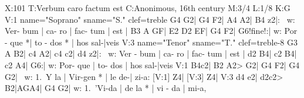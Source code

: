 X:101
T:Verbum caro factum est
C:Anonimous, 16th century
M:3/4
L:1/8
K:G
V:1 name="Soprano" sname="S." clef=treble
G4 G2| G4 F2| A4 A2| B4 z2|: \
w: Ver- bum | ca- ro | fac- tum | est |
B3 A GF| E2 D2 EF| G4 F2| G6!fine!:|
w: Por - que *| to - dos * | hos sal-|veis
V:3 name="Tenor" sname="T." clef=treble-8
G3 A B2| c4 A2| c4 c2| d4 z2|: \
w: Ver - bum | ca- ro | fac- tum | est |
d2 B4| c2 B4| c2 A4| G6:|
w: Por- que | to- dos  | hos sal-|veis
V:1
B4c2| B2 A2> G2| G4 F2| G4 G2| \
w: 1.~Y la | Vir-gen * | le de-| zi-a:
[V:1] Z4| 
[V:3] Z4| 
V:3
d4 e2| d2c2> B2|AGA4| G4 G2|
w: 1.~'Vi-da | de la * | vi - da | mi-a,
